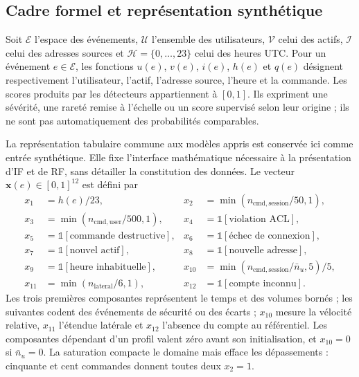 \documentclass[11pt,a4paper,oneside]{report}
\theoremstyle{definition}
\theoremstyle{plain}
\begin{document}
\subsection{Cadre formel et représentation synthétique}
\label{sec:ai-ro-formal}

Soit $\mathcal{E}$ l'espace des événements, $\mathcal{U}$ l'ensemble des utilisateurs, $\mathcal{V}$ celui des actifs, $\mathcal{I}$ celui des adresses sources et $\mathcal{H}=\{0,\ldots,23\}$ celui des heures UTC. Pour un événement $e\in\mathcal{E}$, les fonctions $u(e)$, $v(e)$, $i(e)$, $h(e)$ et $q(e)$ désignent respectivement l'utilisateur, l'actif, l'adresse source, l'heure et la commande. Les scores produits par les détecteurs appartiennent à $[0,1]$. Ils expriment une sévérité, une rareté remise à l'échelle ou un score supervisé selon leur origine ; ils ne sont pas automatiquement des probabilités comparables.

La représentation tabulaire commune aux modèles appris est conservée ici comme entrée synthétique. Elle fixe l'interface mathématique nécessaire à la présentation d'IF et de RF, sans détailler la constitution des données. Le vecteur $\mathbf{x}(e)\in[0,1]^{12}$ est défini par
\begin{align}
x_1&=h(e)/23, &
x_2&=\min(n_{\mathrm{cmd,session}}/50,1),\nonumber\\
x_3&=\min(n_{\mathrm{cmd,user}}/500,1),&
x_4&=\mathbb{1}[\text{violation ACL}],\nonumber\\
x_5&=\mathbb{1}[\text{commande destructive}],&
x_6&=\mathbb{1}[\text{échec de connexion}],\nonumber\\
x_7&=\mathbb{1}[\text{nouvel actif}],&
x_8&=\mathbb{1}[\text{nouvelle adresse}],\nonumber\\
x_9&=\mathbb{1}[\text{heure inhabituelle}],&
x_{10}&=\min(n_{\mathrm{cmd,session}}/\bar n_u,5)/5,\nonumber\\
x_{11}&=\min(n_{\mathrm{lateral}}/6,1),&
x_{12}&=\mathbb{1}[\text{compte inconnu}].
\label{eq:ai-ro-features}
\end{align}
Les trois premières composantes représentent le temps et des volumes bornés ; les suivantes codent des événements de sécurité ou des écarts ; $x_{10}$ mesure la vélocité relative, $x_{11}$ l'étendue latérale et $x_{12}$ l'absence du compte au référentiel. Les composantes dépendant d'un profil valent zéro avant son initialisation, et $x_{10}=0$ si $\bar n_u=0$. La saturation compacte le domaine mais efface les dépassements : cinquante et cent commandes donnent toutes deux $x_2=1$.
\end{document}
